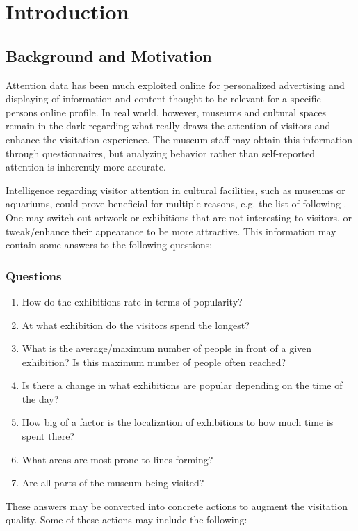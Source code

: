 \section{Introduction}


\subsection{Background and Motivation}
Attention data has been much exploited online for personalized advertising and displaying of information and content thought to be relevant for a specific persons online profile. In real world, however, museums and cultural spaces remain in the dark regarding what really draws the attention of visitors and enhance the visitation experience. The museum staff may obtain this information through questionnaires, but analyzing behavior rather than self-reported attention is inherently more accurate. 

Intelligence regarding visitor attention in cultural facilities, such as museums or aquariums, could prove beneficial for multiple reasons, e.g. the list of following . One may switch out artwork or exhibitions that are not interesting to visitors, or tweak/enhance their appearance to be more attractive. This information may contain some answers to the following questions:
\subsubsection*{Questions}
\begin{enumerate}
    \item How do the exhibitions rate in terms of popularity?
    \item At what exhibition do the visitors spend the longest?
    \item What is the average/maximum number of people in front of a given exhibition? Is this maximum number of people often reached?
    \item Is there a change in what exhibitions are popular depending on the time of the day?
    \item How big of a factor is the localization of exhibitions to how much time is spent there? 
    \item What areas are most prone to lines forming?
    \item Are all parts of the museum being visited?
\end{enumerate}

These answers may be converted into concrete actions to augment the visitation quality. Some of these actions may include the following:
